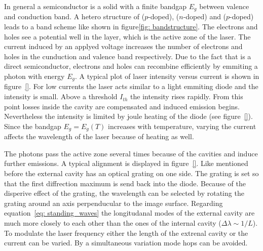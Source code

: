 In general a semiconductor is a solid with a finite bandgap $E_g$ between valence and conduction band. A hetero structure of  ($p$-doped),
 ($n$-doped)
and  ($p$-doped) leads to a band scheme like shown in figure\ref{fig: bandstructure}. The electrons and holes see a potential well
in the  layer, which is the active zone of the laser. The current induced by an applyed voltage increases the number of electrons
and holes in the cunduction and valence band respectively. Due to the fact that  is a direct semiconductor, electrons and holes can
recombine efficiently by emmiting a photon with energy $E_g$. A typical plot of laser intensity versus current is shown in figure~\ref{}. For low
currents the laser acts similar to a light emmiting diode and the intensity is small. Above a threshold $I_{th}$ the intensity rises rapidly.
From this point losses inside the cavity are compensated and induced emission begins. Nevertheless the intensity is limited by joule heating
of the diode (see figure~\ref{}). Since the bandgap $E_g = E_g(T)$ increases with temperature, varying the current affects
the wavelength of the laser because of heating as well.

The photons pass the active zone several times because of the cavities and induce further emissions. A typical alignment is displayed in figure~\ref{}.
Like mentioned before the external cavity has an optical grating on one side. The grating is set so that the first diffrection maximum is send back into the
diode. Because of the disperive effect of the grating, the wavelength can be selected by rotating the grating around an axis perpenducular
to the image surface. Regarding equation~\eqref{eq: standing_waves} the longitudanal modes of the external cavity are much
more closely to each other than the ones of the internal cavity ($\Delta \lambda \sim 1 / L$).
To modulate the laser frequency either the length of the extrenal cavity or the current can be varied. By a simultaneous variation
mode hops can be avoided.
